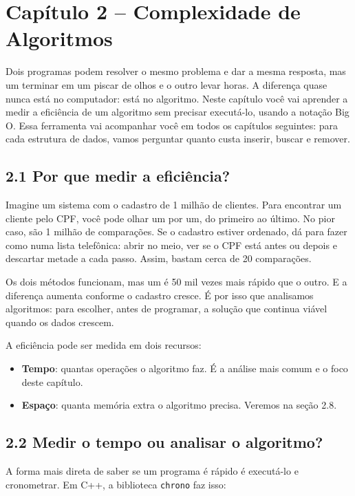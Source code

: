 \section{Capítulo 2 -- Complexidade de Algoritmos}

Dois programas podem resolver o mesmo problema e dar a mesma resposta, mas um terminar em um piscar de olhos e o outro levar horas. A diferença quase nunca está no computador: está no algoritmo. Neste capítulo você vai aprender a medir a eficiência de um algoritmo sem precisar executá-lo, usando a notação Big O. Essa ferramenta vai acompanhar você em todos os capítulos seguintes: para cada estrutura de dados, vamos perguntar quanto custa inserir, buscar e remover.

\subsection{2.1 Por que medir a eficiência?}

Imagine um sistema com o cadastro de 1 milhão de clientes. Para encontrar um cliente pelo CPF, você pode olhar um por um, do primeiro ao último. No pior caso, são 1 milhão de comparações. Se o cadastro estiver ordenado, dá para fazer como numa lista telefônica: abrir no meio, ver se o CPF está antes ou depois e descartar metade a cada passo. Assim, bastam cerca de 20 comparações.

Os dois métodos funcionam, mas um é 50 mil vezes mais rápido que o outro. E a diferença aumenta conforme o cadastro cresce. É por isso que analisamos algoritmos: para escolher, antes de programar, a solução que continua viável quando os dados crescem.

A eficiência pode ser medida em dois recursos:

\begin{itemize}
  \item \textbf{Tempo}: quantas operações o algoritmo faz. É a análise mais comum e o foco deste capítulo.
  \item \textbf{Espaço}: quanta memória extra o algoritmo precisa. Veremos na seção 2.8.
\end{itemize}

\subsection{2.2 Medir o tempo ou analisar o algoritmo?}

A forma mais direta de saber se um programa é rápido é executá-lo e cronometrar. Em C++, a biblioteca \texttt{chrono} faz isso:

